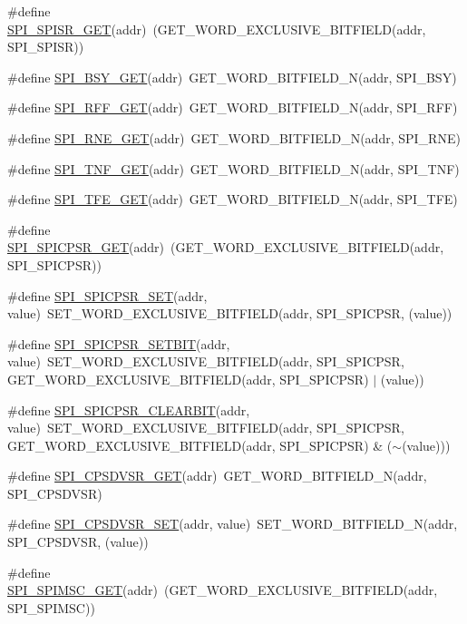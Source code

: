 \begin{DoxyCompactItemize}
\item 
\#define \hyperlink{a00572_a54330444b209a026c869c8fb011e99fc}{SPI\_\-SPISR\_\-GET}(addr)~(GET\_\-WORD\_\-EXCLUSIVE\_\-BITFIELD(addr, SPI\_\-SPISR))
\item 
\#define \hyperlink{a00572_aca0ec790834f4939d0d9d2be2b8d123e}{SPI\_\-BSY\_\-GET}(addr)~GET\_\-WORD\_\-BITFIELD\_\-N(addr, SPI\_\-BSY)
\item 
\#define \hyperlink{a00572_ae4f78396316c2c97e39e4876fdea64cb}{SPI\_\-RFF\_\-GET}(addr)~GET\_\-WORD\_\-BITFIELD\_\-N(addr, SPI\_\-RFF)
\item 
\#define \hyperlink{a00572_aff62d00e65a45dfb2aab3e82bc37e594}{SPI\_\-RNE\_\-GET}(addr)~GET\_\-WORD\_\-BITFIELD\_\-N(addr, SPI\_\-RNE)
\item 
\#define \hyperlink{a00572_a867349e960851360302e44d8bbc57dcf}{SPI\_\-TNF\_\-GET}(addr)~GET\_\-WORD\_\-BITFIELD\_\-N(addr, SPI\_\-TNF)
\item 
\#define \hyperlink{a00572_a1ce5b2755d77fbbc68c0ae9d495c92b3}{SPI\_\-TFE\_\-GET}(addr)~GET\_\-WORD\_\-BITFIELD\_\-N(addr, SPI\_\-TFE)
\item 
\#define \hyperlink{a00572_aa8c8c115e9a2405ae023c3367bec729f}{SPI\_\-SPICPSR\_\-GET}(addr)~(GET\_\-WORD\_\-EXCLUSIVE\_\-BITFIELD(addr, SPI\_\-SPICPSR))
\item 
\#define \hyperlink{a00572_ad6feb059b7666d5a2bca66ad1f13a00f}{SPI\_\-SPICPSR\_\-SET}(addr, value)~SET\_\-WORD\_\-EXCLUSIVE\_\-BITFIELD(addr, SPI\_\-SPICPSR, (value))
\item 
\#define \hyperlink{a00572_aeb115a518d474c3682221de9ae992f00}{SPI\_\-SPICPSR\_\-SETBIT}(addr, value)~SET\_\-WORD\_\-EXCLUSIVE\_\-BITFIELD(addr, SPI\_\-SPICPSR, GET\_\-WORD\_\-EXCLUSIVE\_\-BITFIELD(addr, SPI\_\-SPICPSR) $|$ (value))
\item 
\#define \hyperlink{a00572_adc895c7c49f9c66d0e0c87c96e5178e2}{SPI\_\-SPICPSR\_\-CLEARBIT}(addr, value)~SET\_\-WORD\_\-EXCLUSIVE\_\-BITFIELD(addr, SPI\_\-SPICPSR, GET\_\-WORD\_\-EXCLUSIVE\_\-BITFIELD(addr, SPI\_\-SPICPSR) \& ($\sim$(value)))
\item 
\#define \hyperlink{a00572_a9bf1d12e75139e86410bf16eee145f24}{SPI\_\-CPSDVSR\_\-GET}(addr)~GET\_\-WORD\_\-BITFIELD\_\-N(addr, SPI\_\-CPSDVSR)
\item 
\#define \hyperlink{a00572_a6507e9f6ee56d2ae91af1865479b0748}{SPI\_\-CPSDVSR\_\-SET}(addr, value)~SET\_\-WORD\_\-BITFIELD\_\-N(addr, SPI\_\-CPSDVSR, (value))
\item 
\#define \hyperlink{a00572_a94c104f3e915e2500ac5cf9eea17874e}{SPI\_\-SPIMSC\_\-GET}(addr)~(GET\_\-WORD\_\-EXCLUSIVE\_\-BITFIELD(addr, SPI\_\-SPIMSC))

\end{DoxyCompactItemize}
